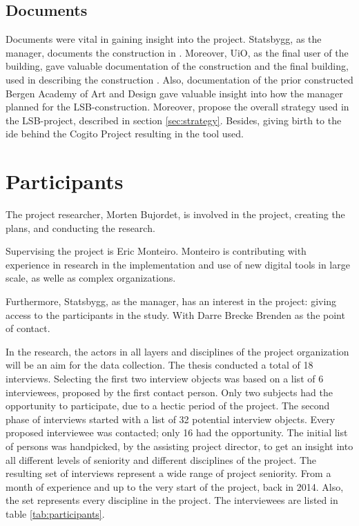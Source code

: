 \subsection*{Documents}
Documents were vital in gaining insight into the project. Statsbygg, as the manager, documents the construction in \citep{statsbygg2019uio}. Moreover, UiO, as the final user of the building, gave valuable documentation of the construction and the final building, used in describing the construction \citep{uio2019science}. Also, documentation of the prior constructed Bergen Academy of Art and Design \citep{lean_i_praksis} gave valuable insight into how the manager planned for the LSB-construction. Moreover, propose the overall strategy used in the LSB-project, described in section \ref{sec:strategy}. Besides, giving birth to the ide behind the Cogito Project resulting in the tool used. 

\section{Participants}
The project researcher, Morten Bujordet, is involved in the project, creating the plans, and conducting the research.
	 
Supervising the project is Eric Monteiro. Monteiro is contributing with experience in research in the implementation and use of new digital tools in large scale, as welle as complex organizations. 

Furthermore, Statsbygg, as the manager, has an interest in the project: giving access to the participants in the study. With Darre Brecke Brenden as the point of contact.
	 
In the research, the actors in all layers and disciplines of the project organization will be an aim for the data collection. The thesis conducted a total of 18 interviews. Selecting the first two interview objects was based on a list of 6 interviewees, proposed by the first contact person. Only two subjects had the opportunity to participate, due to a hectic period of the project.  The second phase of interviews started with a list of 32 potential interview objects. Every proposed interviewee was contacted; only 16 had the opportunity. The initial list of persons was handpicked, by the assisting project director, to get an insight into all different levels of seniority and different disciplines of the project. The resulting set of interviews represent a wide range of project seniority. From a month of experience and up to the very start of the project, back in 2014. Also, the set represents every discipline in the project. The interviewees are listed in table \ref{tab:participants}.

